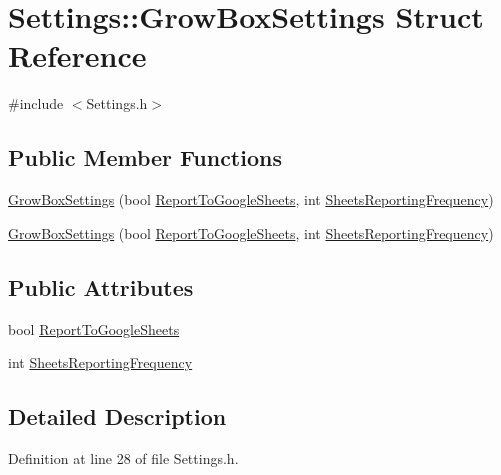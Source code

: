 \hypertarget{struct_settings_1_1_grow_box_settings}{}\section{Settings\+:\+:Grow\+Box\+Settings Struct Reference}
\label{struct_settings_1_1_grow_box_settings}


{\ttfamily \#include $<$Settings.\+h$>$}

\subsection*{Public Member Functions}
\begin{DoxyCompactItemize}
\item 
\hyperlink{struct_settings_1_1_grow_box_settings_a7264f684d55775269c59b99d8c9f6f1e}{Grow\+Box\+Settings} (bool \hyperlink{struct_settings_1_1_grow_box_settings_a464dc992e7fbcd7bc6f86203647433cd}{Report\+To\+Google\+Sheets}, int \hyperlink{struct_settings_1_1_grow_box_settings_aeb6b81dc659906f6966d6d4b3d450f9c}{Sheets\+Reporting\+Frequency})
\item 
\hyperlink{struct_settings_1_1_grow_box_settings_a7264f684d55775269c59b99d8c9f6f1e}{Grow\+Box\+Settings} (bool \hyperlink{struct_settings_1_1_grow_box_settings_a464dc992e7fbcd7bc6f86203647433cd}{Report\+To\+Google\+Sheets}, int \hyperlink{struct_settings_1_1_grow_box_settings_aeb6b81dc659906f6966d6d4b3d450f9c}{Sheets\+Reporting\+Frequency})
\end{DoxyCompactItemize}
\subsection*{Public Attributes}
\begin{DoxyCompactItemize}
\item 
bool \hyperlink{struct_settings_1_1_grow_box_settings_a464dc992e7fbcd7bc6f86203647433cd}{Report\+To\+Google\+Sheets}
\item 
int \hyperlink{struct_settings_1_1_grow_box_settings_aeb6b81dc659906f6966d6d4b3d450f9c}{Sheets\+Reporting\+Frequency}
\end{DoxyCompactItemize}


\subsection{Detailed Description}


Definition at line 28 of file Settings.\+h.



